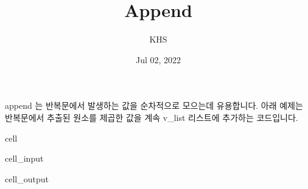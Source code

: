 \documentclass[letterpaper,10pt,english]{jupyterBook}
\title{Append}
\date{Jul 02, 2022}
\author{KHS}
\begin{document}
\pagestyle{empty}
\sphinxmaketitle
\pagestyle{plain}
\sphinxtableofcontents
\pagestyle{normal}
\label{\detokenize{chapter2/2.2.1_Useful_Techniques::doc}}


\sphinxAtStartPar
append 는 반복문에서 발생하는 값을 순차적으로 모으는데 유용합니다. 아래 예제는 반복문에서 추출된 원소를 제곱한 값을 계속 v\_list 리스트에 추가하는 코드입니다.

\begin{sphinxuseclass}{cell}\begin{sphinxVerbatimInput}

\begin{sphinxuseclass}{cell_input}
\begin{sphinxVerbatim}[commandchars=\\\{\}]
  \PYG{p}{[}\PYG{p}{]}

  \PYG{p}{[}    \PYG{p}{]}

   
    
\end{sphinxVerbatim}

\end{sphinxuseclass}\end{sphinxVerbatimInput}
\begin{sphinxVerbatimOutput}

\begin{sphinxuseclass}{cell_output}
\begin{sphinxVerbatim}[commandchars=\\\{\}]
[1, 4, 9, 16, 25]
\end{sphinxVerbatim}

\end{sphinxuseclass}\end{sphinxVerbatimOutput}

\end{sphinxuseclass}
\end{document}
